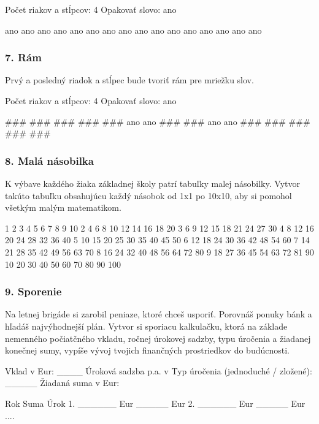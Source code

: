 \begin{code}
Počet riakov a stĺpcov: 4
Opakovať slovo: ano

ano ano ano ano
ano ano ano ano
ano ano ano ano
ano ano ano ano
\end{code}



\subsubsection*{7. Rám}
Prvý a posledný riadok a stĺpec bude tvoriť rám pre mriežku slov.

\begin{code}
Počet riakov a stĺpcov: 4
Opakovať slovo: ano

### ### ### ###
### ano ano ###
### ano ano ###
### ### ### ###
\end{code}


\subsubsection*{8. Malá násobilka}
K výbave každého žiaka základnej školy patrí tabuľky malej násobilky. Vytvor takúto tabuľku obsahujúcu každý násobok od 1x1 po 10x10, aby si pomohol všetkým malým matematikom.

\begin{code}
   1   2   3   4   5   6   7   8   9  10
   2   4   6   8  10  12  14  16  18  20
   3   6   9  12  15  18  21  24  27  30
   4   8  12  16  20  24  28  32  36  40
   5  10  15  20  25  30  35  40  45  50
   6  12  18  24  30  36  42  48  54  60
   7  14  21  28  35  42  49  56  63  70
   8  16  24  32  40  48  56  64  72  80
   9  18  27  36  45  54  63  72  81  90
   10  20  30  40  50  60  70  80  90 100
\end{code}


\subsubsection*{9. Sporenie}
Na letnej brigáde si zarobil peniaze, ktoré chceš usporiť. Porovnáš ponuky bánk a hľadáš najvýhodnejší plán. Vytvor si sporiacu kalkulačku, ktorá na základe nemenného počiatčného vkladu, ročnej úrokovej sadzby, typu úročenia a žiadanej konečnej sumy, vypíše vývoj tvojich finančných prostriedkov do budúcnosti.

\begin{code}
Vklad v Eur: ____
Úroková sadzba p.a. v %
Typ úročenia (jednoduché / zložené): _____
Žiadaná suma v Eur:

Rok      Suma         Úrok
  1.	     ______ Eur   _____ Eur
  2.     ______ Eur   _____ Eur
....
\end{code}




